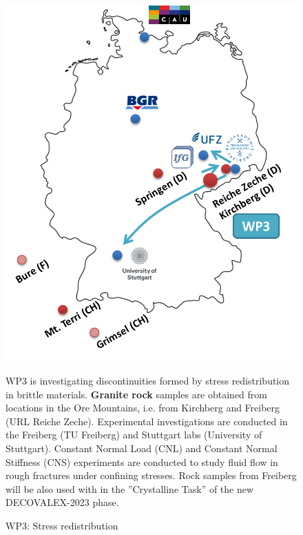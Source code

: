 \begin{figure}[ht!]
\begin{minipage}{0.48\textwidth}
\includegraphics[width=\textwidth]{figures/geomint-wp3.png}
\caption{WP3: Stress redistribution}
\end{minipage}
\hfill
\begin{minipage}{0.48\textwidth}
WP3 is investigating discontinuities formed by stress redistribution in brittle materials. \textbf{Granite rock} samples are obtained from locations in the Ore Mountains, i.e. from Kirchberg and Freiberg (URL Reiche Zeche). Experimental  investigations are conducted in the Freiberg (TU Freiberg) and Stuttgart labs (University of Stuttgart). Constant Normal Load (CNL) and Constant Normal Stiffness (CNS) experiments are conducted to study fluid flow in rough fractures under confining stresses. Rock samples from Freiberg will be also used with in the ''Crystalline Task'' of the new DECOVALEX-2023 phase.
\end{minipage}
\end{figure}

